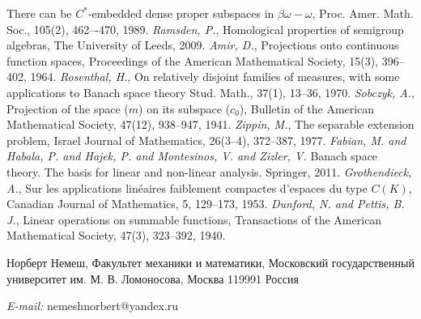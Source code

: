 \documentclass[12pt]{article}
\begin{document}
\begin{thebibliography}{999}
    There can be $C^*$-embedded dense proper subspaces in $\beta\omega-\omega$,
    Proc. Amer. Math. Soc., 105(2), 462–-470, 1989.
    \textit{Ramsden, P.}, Homological properties of semigroup algebras, The
    University of Leeds, 2009.
    \textit{Amir, D.}, Projections onto continuous function spaces, Proceedings
    of the American Mathematical Society, 15(3), 396--402, 1964.
    \textit{Rosenthal, H.}, On relatively disjoint families of measures, with
    some applications to Banach space theory Stud. Math., 37(1), 13--36, 1970.
    \textit{Sobczyk, A.}, Projection of the space ($m$) on its subspace ($c_0$),
    Bulletin of the American Mathematical Society, 47(12), 938--947, 1941.
    \textit{Zippin, M.}, The separable extension problem, Israel Journal of
    Mathematics, 26(3--4), 372--387, 1977.
    \textit{Fabian, M. and Habala, P. and Hajek, P. and Montesinos, V.
        and Zizler, V.}
    Banach space theory. The basis for linear and non-linear analysis. Springer,
    2011.
    \textit{{Grothendieck, A.}}, Sur les applications lin{\'e}aires faiblement
    compactes d'espaces du type $C(K)$, Canadian Journal of Mathematics, 5,
    129--173, 1953.
    \textit{Dunford, N. and Pettis, B. J.}, Linear operations on summable
    functions, Transactions of the American Mathematical Society, 47(3),
    323--392, 1940.
\end{thebibliography}

Норберт Немеш, Факультет механики и математики, Московский государственный
университет им. М. В. Ломоносова, Москва 119991 Россия

\textit{E-mail:} nemeshnorbert@yandex.ru
\end{document}
